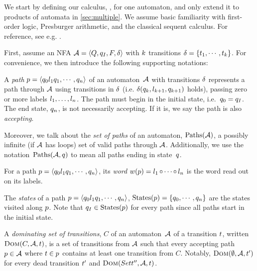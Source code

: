 We start by defining our calculus, \Calculus{}, for one automaton, and only
extend it to products of automata in \cref{sec:multiple}. We assume basic
familiarity with first-order logic, Presburger arithmetic, and the classical
sequent calculus. For reference, see e.g. \cite{Fitting96a}.


First, assume an NFA $\mathcal{A} = \left\langle Q, q_I, F, \delta\right\rangle$ with $k$
transitions $\delta =
\left\{t_{1} , \cdots , t_{k}\right\}$. For convenience, we then
introduce the following supporting notations:

\begin{definition}
  A \textit{path} $p = \left\langle q_0 l_1 q_1 , \cdots , q_n\right\rangle$ of an automaton~$\mathcal{A}$ with
  transitions $\delta$ represents a path through $\mathcal{A}$ using
  transitions in $\delta$ (i.e. $\delta(q_k, l_{k+1},
  q_{k+1})$ holds), passing zero or more labels $l_1, \ldots,
  l_n$. The path must begin in the initial state, i.e.~$q_0 =
  q_I$. The end state, $q_n$, is not necessarily accepting. If it
  is, we say the path is also \textit{accepting}.
  \end{definition}

\begin{definition}
  Moreover, we talk about the \textit{set of paths} of an automaton,
  $\operatorname{Paths}(\mathcal{A})$, a possibly infinite (if $\mathcal{A}$ has loops) set of
  valid paths through $\mathcal{A}$. Additionally, we use the
  notation~$\operatorname{Paths}(\mathcal{A}, q)$ to mean all paths ending in
  state~$q$.
\end{definition}

\begin{definition}
  For a path $p = \left\langle q_0 l_1 q_1 , \cdots ,
  q_n\right\rangle$, its \textit{word} $w(p) = l_1 \operatorname{\circ} \cdots \operatorname{\circ}
  l_n$ is the word read out on its labels.
\end{definition}

\begin{definition}
  The \textit{states} of a path $p = \left\langle q_0 l_1 q_1
  , \cdots , q_n\right\rangle$, $\operatorname{States}(p) = \left\{q_0, \cdots ,
  q_n\right\}$ are the states visited along $p$. Note that $q_I \in
  \operatorname{States}(p)$ for every path since all paths start in the initial state.
\end{definition}

\begin{definition}
  A \textit{dominating set of transitions}, $C$ of an automaton~$\mathcal{A}$ of
  a transition $t$, written $\operatorname{\textsc{Dom}}(C, \mathcal{A}, t)$,
  is a set of transitions from $\mathcal{A}$ such that every accepting path $p
  \in \mathcal{A}$ where $t \in p$ contains at least one transition
  from $C$. Notably, $\operatorname{\textsc{Dom}}(\emptyset, \mathcal{A}, t')$ for every
  dead transition $t'$ and $\operatorname{\textsc{Dom}}(Set{t''}, \mathcal{A},
  t)$.
\end{definition}

